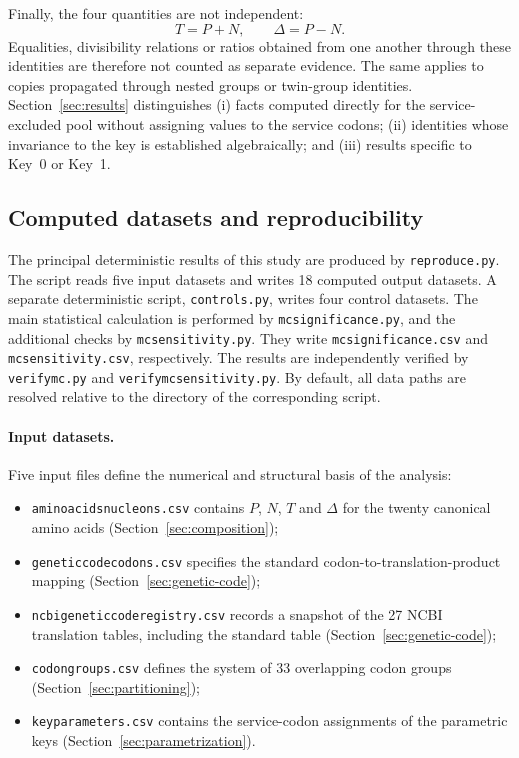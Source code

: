 \documentclass[11pt,a4paper]{article}
\renewcommand{\_}{\origunderscore\allowbreak}
\begin{document}
Finally, the four quantities are not independent:
\[
T=P+N,
\qquad
\Delta=P-N.
\]
Equalities, divisibility relations or ratios obtained from one another
through these identities are therefore not counted as separate
evidence. The same applies to copies propagated through nested groups
or twin-group identities. Section~\ref{sec:results} distinguishes
(i) facts computed directly for the service-excluded pool without
assigning values to the service codons; (ii) identities whose invariance to the
key is established algebraically; and (iii) results specific to
Key~0 or Key~1.

\subsection{Computed datasets and reproducibility}
\label{sec:datasets}

\begingroup\sloppy

The principal deterministic results of this study are produced by
\texttt{reproduce.py}. The script reads five input datasets and
writes 18 computed output datasets. A separate deterministic script,
\texttt{controls.py}, writes four control datasets. The main
statistical calculation is performed by \texttt{mc\_significance.py},
and the additional checks by \texttt{mc\_sensitivity.py}. They write
\texttt{mc\_significance.csv} and \texttt{mc\_sensitivity.csv},
respectively. The results are independently verified by
\texttt{verify\_mc.py} and \texttt{verify\_mc\_sensitivity.py}.
By default, all data paths are resolved relative to the directory
of the corresponding script.

\paragraph{Input datasets.}
Five input files define the numerical and structural basis of the
analysis:
\begin{itemize}
  \item \texttt{amino\_acids\_nucleons.csv} contains $P$, $N$, $T$
        and $\Delta$ for the twenty canonical amino acids
        (Section~\ref{sec:composition});
  \item \texttt{genetic\_code\_codons.csv} specifies the standard
        codon-to-translation-product mapping
        (Section~\ref{sec:genetic-code});
  \item \texttt{ncbi\_genetic\_code\_registry.csv} records a snapshot
        of the 27 NCBI translation tables, including the standard
        table (Section~\ref{sec:genetic-code});
  \item \texttt{codon\_groups.csv} defines the system of 33
        overlapping codon groups
        (Section~\ref{sec:partitioning});
  \item \texttt{key\_parameters.csv} contains the service-codon
        assignments of the parametric keys
        (Section~\ref{sec:parametrization}).
\end{itemize}
\end{document}
